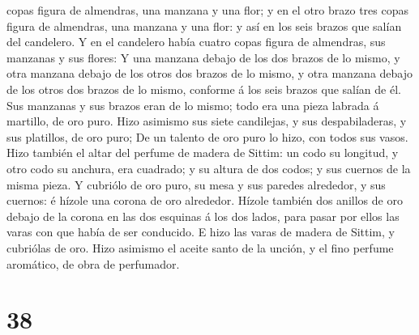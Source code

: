 copas figura de almendras, una manzana y una flor; y en el otro brazo
tres copas figura de almendras, una manzana y una flor: y así en los
seis brazos que salían del candelero.  Y en el candelero
había cuatro copas figura de almendras, sus manzanas y sus flores:
 Y una manzana debajo de los dos brazos de lo mismo, y otra
manzana debajo de los otros dos brazos de lo mismo, y otra manzana
debajo de los otros dos brazos de lo mismo, conforme á los seis brazos
que salían de él.  Sus manzanas y sus brazos eran de lo
mismo; todo era una pieza labrada á martillo, de oro puro. 
Hizo asimismo sus siete candilejas, y sus despabiladeras, y sus
platillos, de oro puro;  De un talento de oro puro lo hizo,
con todos sus vasos.  Hizo también el altar del perfume de
madera de Sittim: un codo su longitud, y otro codo su anchura, era
cuadrado; y su altura de dos codos; y sus cuernos de la misma pieza.
 Y cubriólo de oro puro, su mesa y sus paredes alrededor, y
sus cuernos: é hízole una corona de oro alrededor.  Hízole
también dos anillos de oro debajo de la corona en las dos esquinas á los
dos lados, para pasar por ellos las varas con que había de ser
conducido.  E hizo las varas de madera de Sittim, y
cubriólas de oro.  Hizo asimismo el aceite santo de la
unción, y el fino perfume aromático, de obra de perfumador.

\hypertarget{section-37}{%
\section{38}\label{section-37}}

